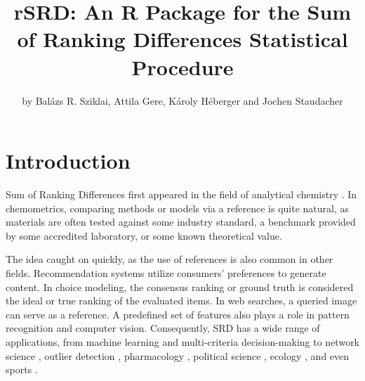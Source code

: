 
\title{rSRD: An R Package for the Sum of Ranking Differences Statistical Procedure}
\author{by Balázs R. Sziklai, Attila Gere, Károly Héberger and Jochen Staudacher}

\maketitle


\section[Introduction]{Introduction} \label{sec:intro}

Sum of Ranking Differences first appeared in the field of analytical chemistry \citep{hebergerSumRankingDifferences2010,KOLLARHUNEK2013139}. In chemometrics, comparing methods or models via a reference is quite natural, as materials are often tested against some industry standard, a benchmark provided by some accredited laboratory, or some known theoretical value.

The idea caught on quickly, as the use of references is also common in other fields. Recommendation systems utilize consumers' preferences to generate content. In choice modeling, the consensus ranking or ground truth is considered the ideal or true ranking of the evaluated items. In web searches, a queried image can serve as a reference. A predefined set of features also plays a role in pattern recognition and computer vision. %
Consequently, SRD has a wide range of applications, from machine learning \citep{Moorthy2017} and multi-criteria decision-making \citep{PETCHROMPO2022} to network science \citep{sziklai_lengyel_2024}, outlier detection \citep{brownfield2017consensus}, pharmacology \citep{Vajna2012}, political science \citep{sziklaiApportionmentDistrictingSum2020}, ecology \citep{WATROBSKI20221}, and even sports \citep{West2018,Gere2022}. %

